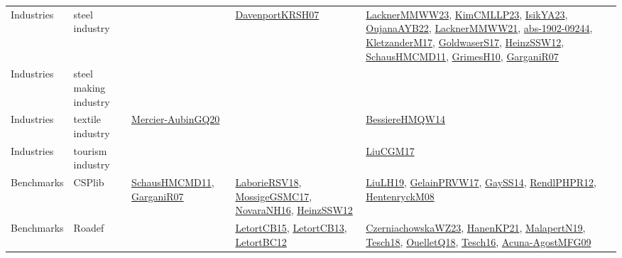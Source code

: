 {\begin{longtable}{lp{3cm}>{\raggedright}p{6cm}>{\raggedright}p{6cm}p{8cm}}
Industries & steel industry &  & \href{papers/DavenportKRSH07.pdf}{DavenportKRSH07}\cite{DavenportKRSH07} & \href{articles/LacknerMMWW23.pdf}{LacknerMMWW23}\cite{LacknerMMWW23}, \href{papers/KimCMLLP23.pdf}{KimCMLLP23}\cite{KimCMLLP23}, \href{articles/IsikYA23.pdf}{IsikYA23}\cite{IsikYA23}, \href{papers/OujanaAYB22.pdf}{OujanaAYB22}\cite{OujanaAYB22}, \href{papers/LacknerMMWW21.pdf}{LacknerMMWW21}\cite{LacknerMMWW21}, \href{articles/abs-1902-09244.pdf}{abs-1902-09244}\cite{abs-1902-09244}, \href{papers/KletzanderM17.pdf}{KletzanderM17}\cite{KletzanderM17}, \href{papers/GoldwaserS17.pdf}{GoldwaserS17}\cite{GoldwaserS17}, \href{articles/HeinzSSW12.pdf}{HeinzSSW12}\cite{HeinzSSW12}, \href{articles/SchausHMCMD11.pdf}{SchausHMCMD11}\cite{SchausHMCMD11}, \href{papers/GrimesH10.pdf}{GrimesH10}\cite{GrimesH10}, \href{papers/GarganiR07.pdf}{GarganiR07}\cite{GarganiR07}\\
Industries & steel making industry &  &  & \\
Industries & textile industry & \href{papers/Mercier-AubinGQ20.pdf}{Mercier-AubinGQ20}\cite{Mercier-AubinGQ20} &  & \href{papers/BessiereHMQW14.pdf}{BessiereHMQW14}\cite{BessiereHMQW14}\\
Industries & tourism industry &  &  & \href{papers/LiuCGM17.pdf}{LiuCGM17}\cite{LiuCGM17}\\
Benchmarks & CSPlib & \href{articles/SchausHMCMD11.pdf}{SchausHMCMD11}\cite{SchausHMCMD11}, \href{papers/GarganiR07.pdf}{GarganiR07}\cite{GarganiR07} & \href{articles/LaborieRSV18.pdf}{LaborieRSV18}\cite{LaborieRSV18}, \href{papers/MossigeGSMC17.pdf}{MossigeGSMC17}\cite{MossigeGSMC17}, \href{articles/NovaraNH16.pdf}{NovaraNH16}\cite{NovaraNH16}, \href{articles/HeinzSSW12.pdf}{HeinzSSW12}\cite{HeinzSSW12} & \href{papers/LiuLH19.pdf}{LiuLH19}\cite{LiuLH19}, \href{papers/GelainPRVW17.pdf}{GelainPRVW17}\cite{GelainPRVW17}, \href{papers/GaySS14.pdf}{GaySS14}\cite{GaySS14}, \href{papers/RendlPHPR12.pdf}{RendlPHPR12}\cite{RendlPHPR12}, \href{papers/HentenryckM08.pdf}{HentenryckM08}\cite{HentenryckM08}\\
Benchmarks & Roadef &  & \href{articles/LetortCB15.pdf}{LetortCB15}\cite{LetortCB15}, \href{papers/LetortCB13.pdf}{LetortCB13}\cite{LetortCB13}, \href{papers/LetortBC12.pdf}{LetortBC12}\cite{LetortBC12} & \href{articles/CzerniachowskaWZ23.pdf}{CzerniachowskaWZ23}\cite{CzerniachowskaWZ23}, \href{papers/HanenKP21.pdf}{HanenKP21}\cite{HanenKP21}, \href{papers/MalapertN19.pdf}{MalapertN19}\cite{MalapertN19}, \href{papers/Tesch18.pdf}{Tesch18}\cite{Tesch18}, \href{papers/OuelletQ18.pdf}{OuelletQ18}\cite{OuelletQ18}, \href{papers/Tesch16.pdf}{Tesch16}\cite{Tesch16}, \href{papers/Acuna-AgostMFG09.pdf}{Acuna-AgostMFG09}\cite{Acuna-AgostMFG09}\\

\end{longtable}}

